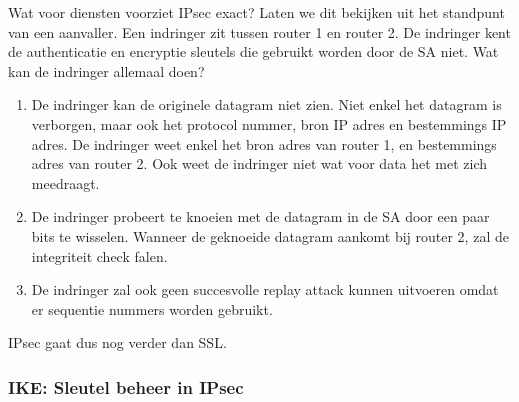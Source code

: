 Wat voor diensten voorziet IPsec exact? Laten we dit bekijken uit het standpunt van een aanvaller.
Een indringer zit tussen router 1 en router 2. De indringer kent de authenticatie en encryptie sleutels die gebruikt worden door de SA niet. Wat kan de indringer allemaal doen?
\begin{enumerate}
    \item De indringer kan de originele datagram niet zien. Niet enkel het datagram is verborgen, maar ook het protocol nummer, bron IP adres en bestemmings IP adres. De indringer weet enkel het bron adres van router 1, en bestemmings adres van router 2. Ook weet de indringer niet wat voor data het met zich meedraagt.
\item De indringer probeert te knoeien met de datagram in de SA door een paar bits te wisselen. Wanneer de geknoeide datagram aankomt bij router 2, zal de integriteit check falen.
\item De indringer zal ook geen succesvolle replay attack kunnen uitvoeren omdat er sequentie nummers worden gebruikt.
\end{enumerate}
IPsec gaat dus nog verder dan SSL.

\clearpage

\subsubsection{IKE: Sleutel beheer in IPsec}

